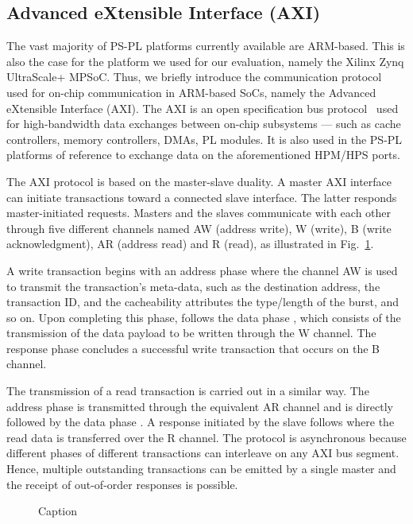\subsection{Advanced eXtensible Interface (AXI)}
\label{subsec:axi_transaction_scheme}
The vast majority of PS-PL platforms currently available are
ARM-based. This is also the case for the platform we used for our
evaluation, namely the Xilinx Zynq UltraScale+ MPSoC. Thus, we briefly
introduce the communication protocol used for on-chip communication in
ARM-based SoCs, namely the Advanced eXtensible Interface (AXI). The
AXI is an open specification bus protocol~\cite{ARM-AXI} used for
high-bandwidth data exchanges between on-chip subsystems --- such as
cache controllers, memory controllers, DMAs, PL modules. It is also
used in the PS-PL platforms of reference to exchange data on the
aforementioned HPM/HPS ports.

The AXI protocol is based on the master-slave duality. A master AXI
interface can initiate transactions toward a connected slave
interface.  The latter responds master-initiated
requests.  Masters and the slaves communicate with each other through
five different channels named AW (address write), W (write), B (write
acknowledgment), AR (address read) and R (read), as illustrated in
Fig.~\ref{fig:axi_transaction_scheme_figure}.

A write transaction begins with an address phase  where the
channel AW is used to transmit the transaction's meta-data, such
as the destination address, the transaction ID, and the cacheability
attributes the type/length of the burst, and so on.  Upon completing this phase, follows the data phase , which
consists of the transmission of the data payload to be written through
the W channel.  The response phase  concludes a successful write transaction that occurs on the B channel.

The transmission of a read transaction is carried out in a similar
way.  The address phase  is transmitted through the
equivalent AR channel and is directly followed by the data phase
.  A response initiated by the slave follows where the
read data is transferred over the R channel. The protocol is
asynchronous because different phases of different transactions can
interleave on any AXI bus segment. Hence, multiple outstanding
transactions can be emitted by a single master and the receipt of
out-of-order responses is possible.

\begin{figure}
  \centering
  
  \caption{Caption}
  \label{fig:axi_transaction_scheme_figure}
\end{figure}
